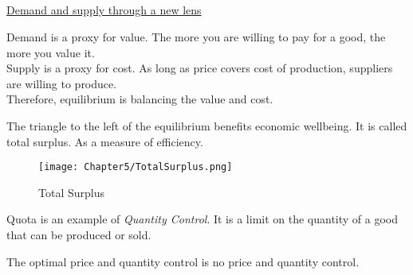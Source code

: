 \subsection{}
\underline{Demand and supply through a new lens}
\par
Demand is a proxy for value. The more you are willing to pay for a good, the more you value it.\\
Supply is a proxy for cost. As long as price covers cost of production, suppliers are willing to produce.\\
Therefore, equilibrium is balancing the value and cost.
\par
The triangle to the left of the equilibrium benefits economic wellbeing. 
It is called total surplus. As a measure of efficiency.
\newline
\begin{figure}[H]
    \centering
    \texttt{[image: Chapter5/TotalSurplus.png]}
    \caption{Total Surplus}
\end{figure}
Quota is an example of \emph{Quantity Control}. It is a limit on the quantity of a good that can be produced or sold.
\par
The optimal price and quantity control is no price and quantity control.
